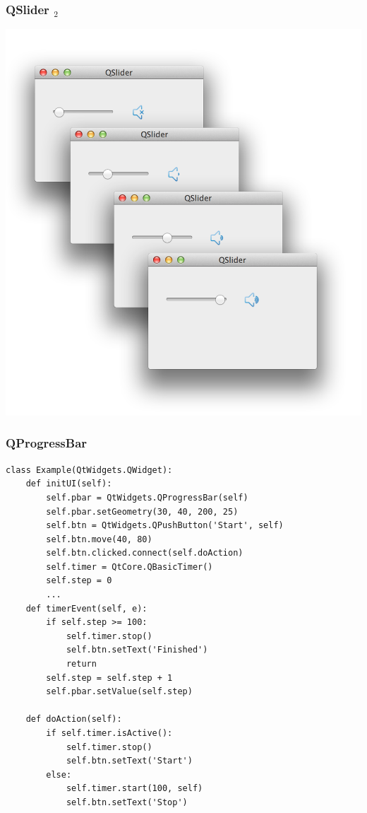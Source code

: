 \documentclass[utf8,compress]{beamer}
\begin{document}
\begin{frame}[fragile]
  \frametitle{QSlider $_2$}
\begin{center}
\includegraphics[scale=0.17]{pyqt14.png}
\end{center}
\end{frame}

\begin{frame}
  \frametitle{QProgressBar}
\begin{verbatim}
class Example(QtWidgets.QWidget):
    def initUI(self):
        self.pbar = QtWidgets.QProgressBar(self)
        self.pbar.setGeometry(30, 40, 200, 25)
        self.btn = QtWidgets.QPushButton('Start', self)
        self.btn.move(40, 80)
        self.btn.clicked.connect(self.doAction)
        self.timer = QtCore.QBasicTimer()
        self.step = 0
        ...
    def timerEvent(self, e):      
        if self.step >= 100:
            self.timer.stop()
            self.btn.setText('Finished')
            return
        self.step = self.step + 1
        self.pbar.setValue(self.step)

    def doAction(self):
        if self.timer.isActive():
            self.timer.stop()
            self.btn.setText('Start')
        else:
            self.timer.start(100, self)
            self.btn.setText('Stop')
\end{verbatim}
\end{frame}
\end{document}

